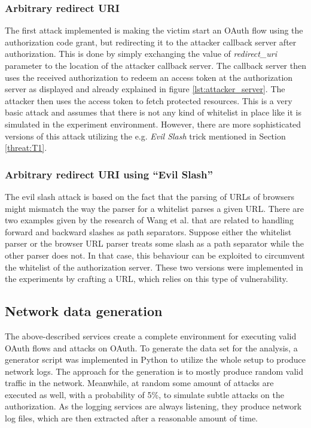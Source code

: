 \documentclass[
    fontsize=12pt,
    headings=small,
    parskip=half,           %
    bibliography=totoc,
    numbers=noenddot,       %
    open=any,               %
    ]{scrreprt}
\begin{document}
\subsubsection{Arbitrary redirect URI}
The first attack implemented is making the victim start an OAuth flow using the authorization code grant, but redirecting it to the attacker callback server after authorization. This is done by simply exchanging the value of \emph{redirect\_uri} parameter to the location of the attacker callback server. The callback server then uses the received authorization to redeem an access token at the authorization server as displayed and already explained in figure \ref{lst:attacker_server}. The attacker then uses the access token to fetch protected resources. This is a very basic attack and assumes that there is not any kind of whitelist in place like it is simulated in the experiment environment. However, there are more sophisticated versions of this attack utilizing the e.g. \emph{Evil Slash} \cite{wang2019make} trick mentioned in Section \ref{threat:T1}. 

\subsubsection{Arbitrary redirect URI using ``Evil Slash''}
The evil slash attack is based on the fact that the parsing of URLs of browsers might mismatch the way the parser for a whitelist parses a given URL. There are two examples given by the research of Wang et al. that are related to handling forward and backward slashes as path separators. Suppose either the whitelist parser or the browser URL parser treats some slash as a path separator while the other parser does not. In that case, this behaviour can be exploited to circumvent the whitelist of the authorization server. These two versions were implemented in the experiments by crafting a URL, which relies on this type of vulnerability.

\subsection{Network data generation}
The above-described services create a complete environment for executing valid OAuth flows and attacks on OAuth. To generate the data set for the analysis, a generator script was implemented in Python to utilize the whole setup to produce network logs. The approach for the generation is to mostly produce random valid traffic in the network. Meanwhile, at random some amount of attacks are executed as well, with a probability of 5\%, to simulate subtle attacks on the authorization. As the logging services are always listening, they produce network log files, which are then extracted after a reasonable amount of time.
\end{document}
